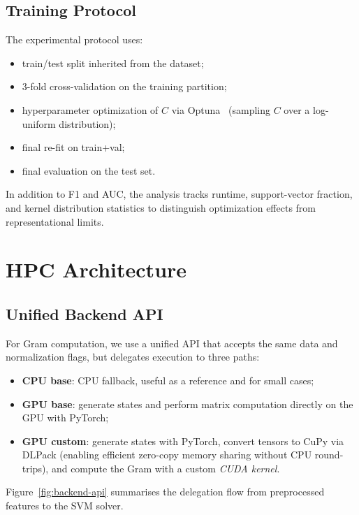 \documentclass[10pt,twocolumn,letterpaper]{article}
\begin{document}
\subsection{Training Protocol}
The experimental protocol uses:
\begin{itemize}
    \item train/test split inherited from the dataset;
    \item 3-fold cross-validation on the training partition;
    \item hyperparameter optimization of $C$ via Optuna~\cite{akiba2019optuna} 
    (sampling $C$ over a log-uniform distribution);
    \item final re-fit on train+val;
    \item final evaluation on the test set.
\end{itemize}

In addition to F1 and AUC, the analysis tracks runtime, support-vector fraction, and kernel distribution statistics 
to distinguish optimization effects from representational limits.

\section{HPC Architecture}
\subsection{Unified Backend API}

For Gram computation, we use a unified API that accepts the same data and normalization flags, 
but delegates execution to three paths:
\begin{itemize}
    \item \textbf{CPU base}: CPU fallback, useful as a reference and for small cases;
    \item \textbf{GPU base}: generate states and perform matrix computation directly on the GPU with PyTorch;
    \item \textbf{GPU custom}: generate states with PyTorch, convert tensors to CuPy via DLPack (enabling 
    efficient zero-copy memory sharing without CPU round-trips), and compute the Gram with a custom \textit{CUDA kernel}.
\end{itemize}
Figure~\ref{fig:backend-api} summarises the delegation flow from preprocessed features to the SVM solver.
\end{document}

